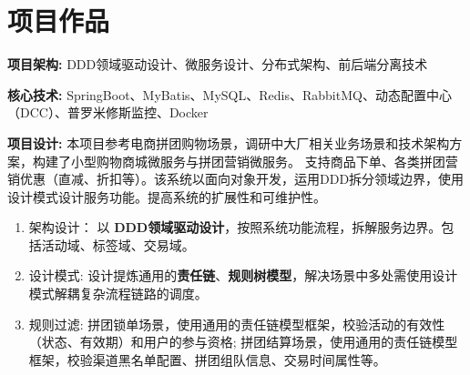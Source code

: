 \documentclass{resume}
\begin{document}
\section{项目作品}
\begin{itemize}[parsep=0ex]
  {\small 
  \item \textbf{项目架构:} DDD领域驱动设计、微服务设计、分布式架构、前后端分离技术
  \vspace{0.1cm}
  \item \textbf{核心技术:} SpringBoot、MyBatis、MySQL、Redis、RabbitMQ、动态配置中心（DCC）、普罗米修斯监控、Docker
  \vspace{0.1cm}
  \item \textbf{项目设计:} 本项目参考电商拼团购物场景，调研中大厂相关业务场景和技术架构方案，构建了小型购物商城微服务与拼团营销微服务。 支持商品下单、各类拼团营销优惠（直减、折扣等）。该系统以面向对象开发，运用DDD拆分领域边界，使用设计模式设计服务功能。提高系统的扩展性和可维护性。
  \vspace{0.03cm}
 \begin{enumerate}[leftmargin = 0.3em, topsep=2pt, itemsep=0pt, parsep=0pt]
  \item 架构设计： 以 \textbf{DDD领域驱动设计}，按照系统功能流程，拆解服务边界。包括活动域、标签域、交易域。
  \vspace{0.07cm}
  \item 设计模式: 设计提炼通用的\textbf{责任链}、\textbf{规则树模型}，解决场景中多处需使用设计模式解耦复杂流程链路的调度。
  \vspace{0.07cm}
  \item 规则过滤: 拼团锁单场景，使用通用的责任链模型框架，校验活动的有效性（状态、有效期）和用户的参与资格; 拼团结算场景，使用通用的责任链模型框架，校验渠道黑名单配置、拼团组队信息、交易时间属性等。
  \vspace{0.07cm}

\end{enumerate}}
\end{itemize}
\end{document}

